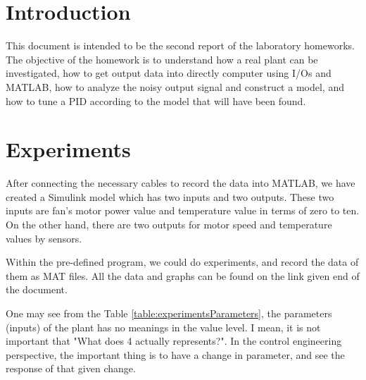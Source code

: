 \documentclass[11pt,a4paper,twocolumn]{article}
\begin{document}



\section{Introduction}
\label{sec:introduction}

This document is intended to be the second report of the laboratory homeworks. The objective of the homework is to understand how a real plant can be investigated, how to get output data into directly computer using I/Os and MATLAB, how to analyze the noisy output signal and construct a model, and how to tune a PID according to the model that will have been found.


\section{Experiments}
\label{sec:outputresponse4temp}

After connecting the necessary cables to record the data into MATLAB, we have created a Simulink model which has two inputs and two outputs. These two inputs are fan's motor power value and temperature value in terms of zero to ten. On the other hand, there are two outputs for motor speed and temperature values by sensors.

Within the pre-defined program, we could do experiments, and record the data of them as MAT files. All the data and graphs can be found on the link given end of the document.

One may see from the Table \ref{table:experimentsParameters}, the parameters (inputs) of the plant has no meanings in the value level. I mean, it is not important that "What does 4 actually represents?". In the control engineering perspective, the important thing is to have a change in parameter, and see the response of that given change.
\end{document}
